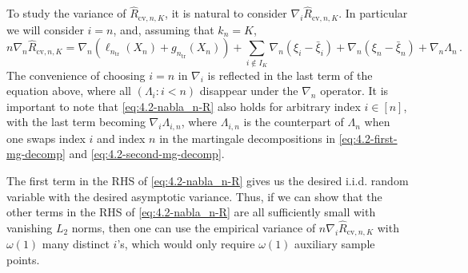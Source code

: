 \documentclass[11pt]{article}
\theoremstyle{plain}
\newcommand{\cv}{{\mathrm{cv}}}
\newcommand{\tr}{{\mathrm{tr}}}
\begin{document}
To study the variance of $\hat R_{\cv,n,K}$, it is natural to consider $\nabla_i \hat R_{\cv,n,K}$.
In particular we will consider $i=n$, and, assuming that $k_n=K$,
\begin{equation}\label{eq:4.2-nabla_n-R}
    n\nabla_n\hat R_{\cv,n,K} =  \nabla_n (\ell_{n_\tr}(X_n)+g_{n_\tr}(X_n))+ \sum_{i\notin I_K}\nabla_n(\xi_i-\bar\xi_i) + \nabla_n(\xi_n-\bar\xi_n) + \nabla_n \Lambda_n\,.
\end{equation}
The convenience of choosing $i=n$ in $\nabla_i$ is reflected in the last term of the equation above, where all $(\Lambda_i:i<n)$ disappear under the $\nabla_n$ operator. It is important to note that \eqref{eq:4.2-nabla_n-R} also holds for arbitrary index $i\in[n]$, with the last term becoming $\nabla_i \Lambda_{i,n}$, where $\Lambda_{i,n}$ is the counterpart of $\Lambda_n$ when one swaps index $i$ and index $n$ in the martingale decompositions in \eqref{eq:4.2-first-mg-decomp} and \eqref{eq:4.2-second-mg-decomp}.

The first term in the RHS of \eqref{eq:4.2-nabla_n-R} gives us the desired i.i.d. random variable with the desired asymptotic variance. Thus, if we can show that the other terms in the RHS of \eqref{eq:4.2-nabla_n-R} are all sufficiently small with vanishing $L_2$ norms, then one can use the empirical variance of $n\nabla_i \hat R_{\cv,n,K}$ with $\omega(1)$ many distinct $i$'s, which would only require $\omega(1)$ auxiliary sample points.
\end{document}
